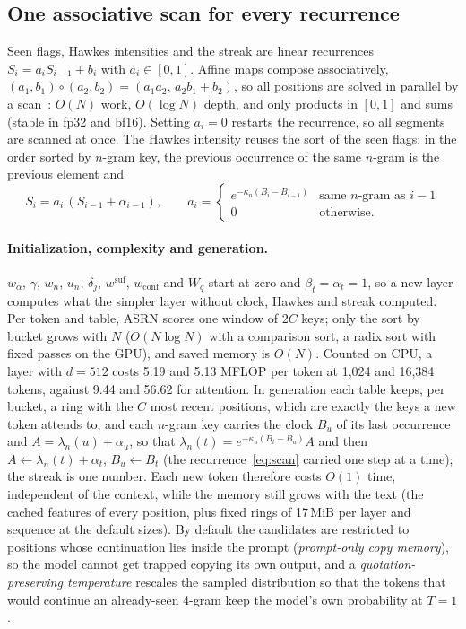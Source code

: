 \documentclass[11pt]{article}
\begin{document}
\subsection{One associative scan for every recurrence}
\label{sec:scan}
Seen flags, Hawkes intensities and the streak are linear recurrences $S_i=a_iS_{i-1}+b_i$ with $a_i\in[0,1]$. Affine
maps compose associatively, $(a_1,b_1)\circ(a_2,b_2)=(a_1a_2,\,a_2b_1+b_2)$, so all positions are solved in parallel
by a scan~\cite{blelloch1990prefix,martin2018parallelizing}: $O(N)$ work, $O(\log N)$ depth, and only products in
$[0,1]$ and sums (stable in fp32 and bf16). Setting $a_i=0$ restarts the recurrence, so all segments are scanned at
once. The Hawkes intensity reuses the sort of the seen flags: in the order sorted by $n$-gram key, the previous
occurrence of the same $n$-gram is the previous element and
\begin{equation}
S_i=a_i\,(S_{i-1}+\alpha_{i-1}),\qquad
a_i=\begin{cases}e^{-\kappa_n(B_i-B_{i-1})}&\text{same }n\text{-gram as }i-1\\0&\text{otherwise.}\end{cases}
\label{eq:scan}
\end{equation}

\paragraph{Initialization, complexity and generation.} $w_\alpha$, $\gamma$, $w_n$, $u_n$, $\delta_j$,
$w^{\mathrm{suf}}$, $w_{\mathrm{conf}}$ and $W_q$ start at zero and $\beta_t=\alpha_t=1$, so a new layer computes what
the simpler layer without clock, Hawkes and streak computed. Per token and table, ASRN scores one window of $2C$ keys;
only the sort by bucket grows with $N$ ($O(N\log N)$ with a comparison sort, a radix sort with fixed passes on the GPU),
and saved memory is $O(N)$. Counted on CPU, a layer with $d=512$ costs 5.19 and 5.13 MFLOP per token at 1{,}024 and
16{,}384 tokens, against 9.44 and 56.62 for attention. In generation each table keeps, per bucket, a ring with the $C$
most recent positions, which are exactly the keys a new token attends to, and each $n$-gram key carries the clock $B_u$
of its last occurrence and $A=\lambda_n(u)+\alpha_u$, so that $\lambda_n(t)=e^{-\kappa_n(B_t-B_u)}A$ and then
$A\leftarrow\lambda_n(t)+\alpha_t$, $B_u\leftarrow B_t$ (the recurrence~\eqref{eq:scan} carried one step at a time); the
streak is one number. Each new token therefore costs $O(1)$ time, independent of the context, while the memory still
grows with the text (the cached features of every position, plus fixed rings of 17\,MiB per layer and sequence at the
default sizes). By default the candidates are restricted to positions whose continuation lies inside the prompt
(\emph{prompt-only copy memory}), so the model cannot get trapped copying its own output, and a
\emph{quotation-preserving temperature} rescales the sampled distribution so that the tokens that would continue an
already-seen 4-gram keep the model's own probability at $T=1$.
\end{document}
